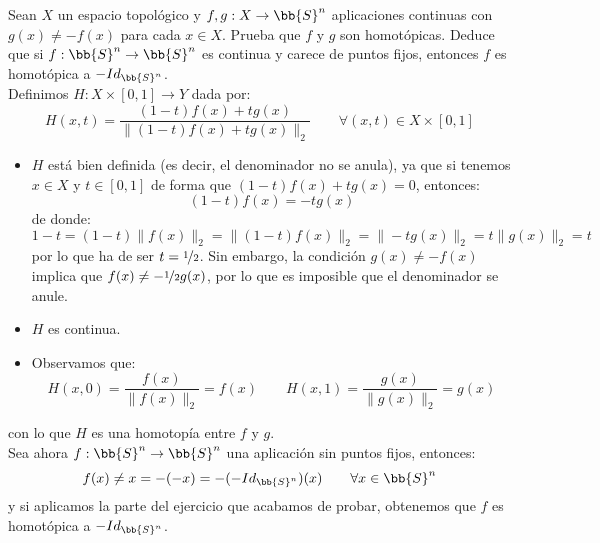\begin{ejercicio}
    Sean $X$ un espacio topológico y $f,g:X\to \bb{S}^n$ aplicaciones continuas con $g(x)\neq -f(x)$ para cada $x\in X$. Prueba que $f$ y $g$ son homotópicas. Deduce que si $f:\bb{S}^n\to \bb{S}^n$ es continua y carece de puntos fijos, entonces $f$ es homotópica a $-Id_{\bb{S}^n}$.\\

    \noindent
    Definimos $H:X\times [0,1]\to Y$ dada por:
    \begin{equation*}
        H(x,t) = \dfrac{(1-t)f(x) + tg(x)}{\|(1-t)f(x) + tg(x)\|_2} \qquad \forall (x,t)\in X\times [0,1]
    \end{equation*}
    \begin{itemize}
        \item $H$ está bien definida (es decir, el denominador no se anula), ya que si tenemos $x\in X$ y $t\in [0,1]$ de forma que $(1-t)f(x)+tg(x) = 0 $, entonces:
            \begin{equation*}
                (1-t)f(x) = -tg(x)
            \end{equation*}
            de donde:
            \begin{equation*}
                1-t = (1-t)\|f(x)\|_2 = \|(1-t)f(x)\|_2 = \|-tg(x)\|_2 = t\|g(x)\|_2 = t
            \end{equation*}
            por lo que ha de ser $t = \nicefrac{1}{2}$. Sin embargo, la condición $g(x)\neq -f(x)$ implica que $f(x) \neq -\nicefrac{1}{2}g(x)$, por lo que es imposible que el denominador se anule.
        \item $H$ es continua.
        \item Observamos que:
            \begin{equation*}
                H(x,0) = \dfrac{f(x)}{\|f(x)\|_2} = f(x) \qquad 
                H(x,1) = \dfrac{g(x)}{\|g(x)\|_2} = g(x) 
            \end{equation*}
    \end{itemize}
    con lo que $H$ es una homotopía entre $f$ y $g$.\\

    \noindent
    Sea ahora $f:\bb{S}^n\to \bb{S}^n$ una aplicación sin puntos fijos, entonces:
    \begin{equation*}
        f(x) \neq x = -(-x) = -(-Id_{\bb{S}^n})(x) \qquad \forall x\in \bb{S}^n
    \end{equation*}
    y si aplicamos la parte del ejercicio que acabamos de probar, obtenemos que $f$ es homotópica a $-Id_{\bb{S}^n}$.
\end{ejercicio}

